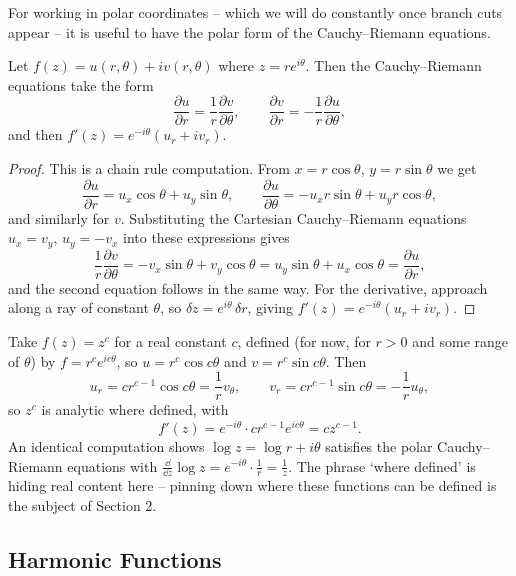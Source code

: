 For working in polar coordinates -- which we will do constantly once branch cuts appear -- it is useful to have the polar form of the Cauchy--Riemann equations.

\begin{proposition}
	Let $f(z) = u(r, \theta) + iv(r, \theta)$ where $z = re^{i\theta}$. Then the Cauchy--Riemann equations take the form
	$$
	\frac{\partial u}{\partial r} = \frac{1}{r}\frac{\partial v}{\partial \theta}, \qquad
	\frac{\partial v}{\partial r} = -\frac{1}{r} \frac{\partial u}{\partial \theta},
	$$
	and then $f'(z) = e^{-i\theta}\left(u_r + i v_r\right)$.
\end{proposition}
\begin{proof}
	This is a chain rule computation. From $x = r \cos\theta$, $y = r\sin \theta$ we get
	$$
	\frac{\partial u}{\partial r} = u_x \cos \theta + u_y \sin \theta, \qquad \frac{\partial u}{\partial \theta} = -u_x r \sin\theta + u_y r \cos\theta,
	$$
	and similarly for $v$. Substituting the Cartesian Cauchy--Riemann equations $u_x = v_y$, $u_y = -v_x$ into these expressions gives
	$$
	\frac{1}{r} \frac{\partial v}{\partial \theta} = -v_x \sin \theta + v_y \cos\theta = u_y \sin\theta + u_x \cos\theta = \frac{\partial u}{\partial r},
	$$
	and the second equation follows in the same way. For the derivative, approach along a ray of constant $\theta$, so $\delta z = e^{i\theta} \, \delta r$, giving $f'(z) = e^{-i\theta}(u_r + iv_r)$.
\end{proof}

\begin{example}
	Take $f(z) = z^c$ for a real constant $c$, defined (for now, for $r>0$ and some range of $\theta$) by $f = r^c e^{ic\theta}$, so $u = r^c \cos c\theta$ and $v = r^c \sin c\theta$. Then
	$$
	u_r = cr^{c-1}\cos c\theta = \frac{1}{r} v_\theta, \qquad v_r = c r^{c - 1} \sin c\theta = -\frac{1}{r} u_\theta,
	$$
	so $z^c$ is analytic where defined, with
	$$
	f'(z) = e^{-i\theta} \cdot c r^{c-1} e^{i c \theta} = c z^{c - 1}.
	$$
	An identical computation shows $\log z = \log r + i\theta$ satisfies the polar Cauchy--Riemann equations with $\frac{\dd}{\dd z} \log z = e^{-i\theta} \cdot \frac{1}{r} = \frac{1}{z}$. The phrase `where defined' is hiding real content here -- pinning down where these functions can be defined is the subject of Section 2.
\end{example}

\subsection{Harmonic Functions}

